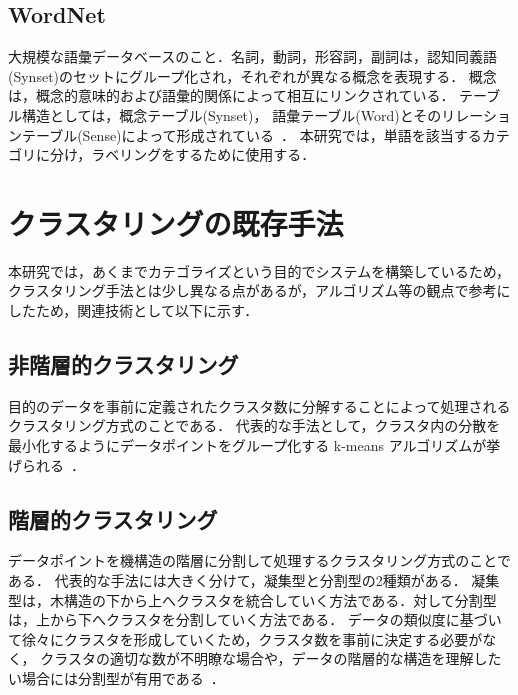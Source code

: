 \subsection{Word{N}et}
\label{subsec:rw_sub_wordnet}
大規模な語彙データベースのこと．名詞，動詞，形容詞，副詞は，認知同義語(Synset)のセットにグループ化され，それぞれが異なる概念を表現する．
概念は，概念的意味的および語彙的関係によって相互にリンクされている．
テーブル構造としては，概念テーブル(Synset)， 語彙テーブル(Word)とそのリレーションテーブル(Sense)によって形成されている~\cite{takeuchi2019wordnet}．
本研究では，単語を該当するカテゴリに分け，ラベリングをするために使用する．

\section{クラスタリングの既存手法}
\label{sec:rw_tech_sub}

本研究では，あくまでカテゴライズという目的でシステムを構築しているため，クラスタリング手法とは少し異なる点があるが，アルゴリズム等の観点で参考にしたため，関連技術として以下に示す．

\subsection{非階層的クラスタリング}
\label{subsec:rw_non_hierar}

目的のデータを事前に定義されたクラスタ数に分解することによって処理されるクラスタリング方式のことである．
代表的な手法として，クラスタ内の分散を最小化するようにデータポイントをグループ化する k-means アルゴリズムが挙げられる~\cite{kurahashi2007k-means}．

\subsection{階層的クラスタリング}
\label{sebsec:rw_hierar}

データポイントを機構造の階層に分割して処理するクラスタリング方式のことである．
代表的な手法には大きく分けて，凝集型と分割型の2種類がある．
凝集型は，木構造の下から上へクラスタを統合していく方法である．対して分割型は，上から下へクラスタを分割していく方法である．
データの類似度に基づいて徐々にクラスタを形成していくため，クラスタ数を事前に決定する必要がなく，
クラスタの適切な数が不明瞭な場合や，データの階層的な構造を理解したい場合には分割型が有用である~\cite{2023hierar}．
